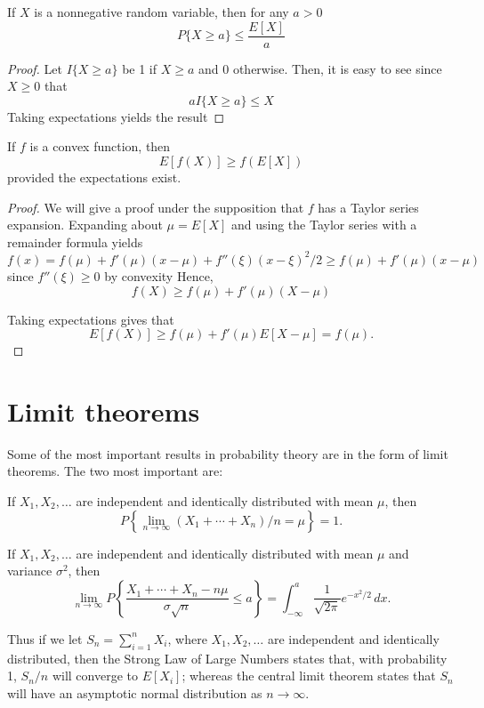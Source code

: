 \documentclass[lang=cn,10pt,thmcnt=section]{elegantbook}
\begin{document}
\begin{lemma}
	If $X$ is a nonnegative random variable, then for any $a > 0$
\[
P\{X \geq a\} \leq \frac{E[X]}{a}
\]
\end{lemma}

\begin{proof}
	Let $I\{X \geq a\}$ be 1 if $X \geq a$ and 0 otherwise. Then, it is easy to see since $X \geq 0$ that
	\[
	a I\{X \geq a\} \leq X
	\]
	Taking expectations yields the result
\end{proof}
\begin{lemma}
	If $f$ is a convex function, then
\[
E[f(X)] \geq f(E[X])
\]
provided the expectations exist.
\end{lemma}
\begin{proof}
	We will give a proof under the supposition that $f$ has a Taylor series expansion. Expanding about $\mu = E[X]$ and using the Taylor series with a remainder formula yields
\[
f(x) = f(\mu) + f'(\mu)(x - \mu) + f''(\xi)(x - \xi)^2/2 \geq f(\mu) + f'(\mu)(x - \mu)
\]
since $f''(\xi) \geq 0$ by convexity Hence,
\[
f(X) \geq f(\mu) + f'(\mu)(X - \mu)
\]

Taking expectations gives that
\[
E[f(X)] \geq f(\mu) + f'(\mu)E[X - \mu] = f(\mu).
\]
\end{proof}
\section{Limit theorems}
Some of the most important results in probability theory are in the form of limit theorems. The two most important are:
\begin{theorem}
	If $X_1, X_2, \ldots$ are independent and identically distributed with mean $\mu$, then
\[
P\left\{\lim_{n \to \infty} (X_1 + \cdots + X_n)/n = \mu\right\} = 1.
\]
\end{theorem}
\begin{theorem}
	If $X_1, X_2, \ldots$ are independent and identically distributed with mean $\mu$ and variance $\sigma^2$, then
\[
\lim_{n \to \infty} P\left\{\frac{X_1 + \cdots + X_n - n\mu}{\sigma \sqrt{n}} \leq a\right\} = \int_{-\infty}^{a} \frac{1}{\sqrt{2\pi}} e^{-x^2/2} \, dx.
\]
\end{theorem}
Thus if we let $S_n = \sum_{i=1}^{n} X_i$, where $X_1, X_2, \ldots$ are independent and identically distributed, then the Strong Law of Large Numbers states that, with probability 1, $S_n/n$ will converge to $E[X_i]$; whereas the central limit theorem states that $S_n$ will have an asymptotic normal distribution as $n \to \infty$.
\end{document}

